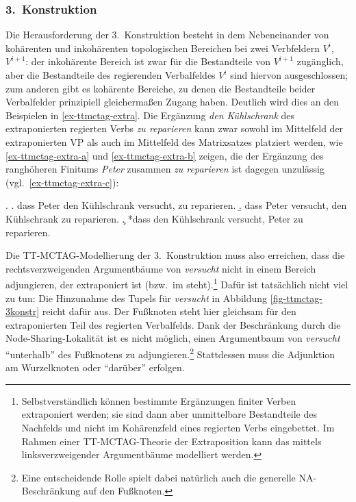 

\subsubsection*{3.~Konstruktion}

Die Herausforderung der 3.~Konstruktion besteht in dem Nebeneinander von kohärenten und inkohärenten topologischen Bereichen bei zwei Verbfeldern $V^i$, $V^{i+1}$: der inkohärente Bereich ist zwar für die Bestandteile von $V^{i+1}$ zugänglich, aber die Bestandteile des regierenden Verbalfeldes $V^i$ sind hiervon ausgeschlossen; zum anderen gibt es kohärente Bereiche, zu denen die Bestandteile beider Verbalfelder prinzipiell gleicherma\ss en Zugang haben. Deutlich wird dies an den Beispielen in \ref{ex-ttmctag-extra}. Die Ergänzung {\it den Kühlschrank} des extraponierten regierten Verbs {\it zu reparieren} kann zwar sowohl im Mittelfeld der extraponierten VP als auch im Mittelfeld des Matrixsatzes platziert werden, wie \ref{ex-ttmctag-extra-a} und \ref{ex-ttmctag-extra-b} zeigen, die  der Ergänzung des ranghöheren Finitums {\it Peter} zusammen \textit{zu reparieren} ist dagegen unzulässig (vgl.\ \ref{ex-ttmctag-extra-c}): 

\ex. \label{ex-ttmctag-extra}
\a. dass Peter den Kühlschrank versucht, zu reparieren. \label{ex-ttmctag-extra-a}
\b. dass Peter versucht, den Kühlschrank zu reparieren. \label{ex-ttmctag-extra-b}
\c. *dass den Kühlschrank versucht, Peter zu reparieren. \label{ex-ttmctag-extra-c}

Die TT-MCTAG-Modellierung der 3.~Konstruktion muss also erreichen, dass die rechtsverzweigenden Argumentbäume von {\it versucht} nicht in einem Bereich adjungieren, der extraponiert ist (bzw.\ im  steht).\footnote{Selbstverständlich können bestimmte Ergänzungen finiter Verben extraponiert werden; sie sind dann aber unmittelbare Bestandteile des Nachfelds und nicht im Kohärenzfeld eines regierten Verbs eingebettet. Im Rahmen einer TT-MCTAG-Theorie der Extraposition kann das mittels linksverzweigender Argumentbäume modelliert werden.} Dafür ist tatsächlich nicht viel zu tun: Die Hinzunahme des Tupels für {\it versucht} in Abbildung \ref{fig-ttmctag-3konstr} reicht dafür aus. Der Fu\ss knoten steht hier gleichsam für den extraponierten Teil des regierten Verbalfelds. Dank der Beschränkung durch die Node-Sharing-Lokalität ist es nicht möglich, einen Argumentbaum von {\it versucht} "`unterhalb"' des Fu\ss knotens zu adjungieren.\footnote{Eine entscheidende Rolle spielt dabei natürlich auch die generelle NA-Beschränkung auf den Fu\ss knoten.} Stattdessen muss die Adjunktion am Wurzelknoten oder "`darüber"' erfolgen. 


